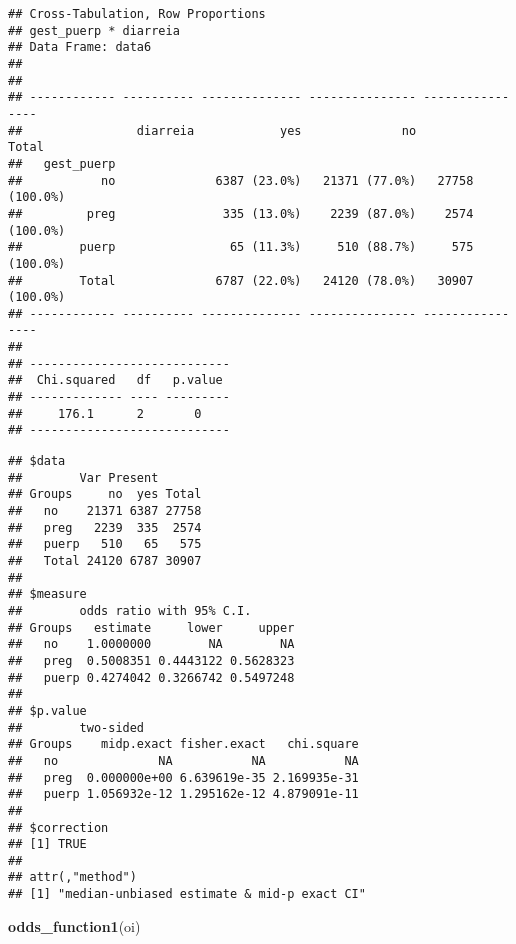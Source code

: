 \documentclass[
]{article}
\newenvironment{Shaded}{\begin{snugshade}}{\end{snugshade}}
\newcommand{\KeywordTok}[1]{\textcolor[rgb]{0.13,0.29,0.53}{\textbf{#1}}}
\newcommand{\NormalTok}[1]{#1}
\newcommand{\OperatorTok}[1]{\textcolor[rgb]{0.81,0.36,0.00}{\textbf{#1}}}
\newcommand{\StringTok}[1]{\textcolor[rgb]{0.31,0.60,0.02}{#1}}
\begin{document}
\begin{verbatim}
## Cross-Tabulation, Row Proportions  
## gest_puerp * diarreia  
## Data Frame: data6  
## 
## 
## ------------ ---------- -------------- --------------- ----------------
##                diarreia            yes              no            Total
##   gest_puerp                                                           
##           no              6387 (23.0%)   21371 (77.0%)   27758 (100.0%)
##         preg               335 (13.0%)    2239 (87.0%)    2574 (100.0%)
##        puerp                65 (11.3%)     510 (88.7%)     575 (100.0%)
##        Total              6787 (22.0%)   24120 (78.0%)   30907 (100.0%)
## ------------ ---------- -------------- --------------- ----------------
## 
## ----------------------------
##  Chi.squared   df   p.value 
## ------------- ---- ---------
##     176.1      2       0    
## ----------------------------
\end{verbatim}

\begin{Shaded}
\end{Shaded}

\begin{verbatim}
## $data
##        Var Present
## Groups     no  yes Total
##   no    21371 6387 27758
##   preg   2239  335  2574
##   puerp   510   65   575
##   Total 24120 6787 30907
## 
## $measure
##        odds ratio with 95% C.I.
## Groups   estimate     lower     upper
##   no    1.0000000        NA        NA
##   preg  0.5008351 0.4443122 0.5628323
##   puerp 0.4274042 0.3266742 0.5497248
## 
## $p.value
##        two-sided
## Groups    midp.exact fisher.exact   chi.square
##   no              NA           NA           NA
##   preg  0.000000e+00 6.639619e-35 2.169935e-31
##   puerp 1.056932e-12 1.295162e-12 4.879091e-11
## 
## $correction
## [1] TRUE
## 
## attr(,"method")
## [1] "median-unbiased estimate & mid-p exact CI"
\end{verbatim}

\begin{Shaded}
\begin{Highlighting}[]
\KeywordTok{odds_function1}\NormalTok{(oi)}
\end{Highlighting}
\end{Shaded}
\end{document}
